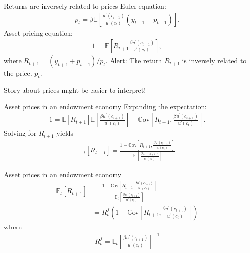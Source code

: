 \documentclass[presentation,dvipsnames]{beamer}
\begin{document}
\begin{frame}[label=sec-4-2]{Returns are inversely related to prices}
Euler equation: %
\begin{align*}
p_{t} = \beta \mathbb{E} \left[ \frac{u^{\prime}(c_{t+1})}{u^{\prime}(c_{t})} (y_{t+1}+p_{t+1}) \right].
\end{align*}
Asset-pricing equation:
\begin{align*}
1 = \mathbb{E} \left[ R_{t+1} \frac{\beta u^{\prime}(c_{t+1})}{c^{\prime}(c_{t})} \right],
\end{align*}
where $R_{t+1} = (y_{t+1} + p_{t+1})/p_{t}$.
\alert{Alert}: The return $R_{t+1}$ is inversely related to the price, $p_{t}$.

\vspace{1em}

\textcolor{RubineRed}{Story about prices might be easier to interpret!}
\end{frame}

\begin{frame}[label=sec-4-3]{Asset prices in an endowment economy}
Expanding the expectation: 
\begin{align*}
1 = \mathbb{E} \left[ R_{t+1} \right] \mathbb{E} \left[ \frac{\beta u^{\prime}(c_{t+1})}{u^{\prime}(c_{t})} \right] + \mathbb{C} \text{ov} \left[ R_{t+1}, \frac{\beta u^{\prime}(c_{t+1})}{u^{\prime}(c_{t})} \right].
\end{align*}
Solving for $R_{t+1}$ yields
\begin{align*}
\mathbb{E}_{t} \left[ R_{t+1} \right] = \frac{1 - \mathbb{C} \text{ov} \left[ R_{t+1}, \frac{\beta u^{\prime}(c_{t+1})}{u^{\prime}(c_{t})} \right]}{ \mathbb{E}_{t} \left[ \frac{\beta u^{\prime}(c_{t+1})}{u^{\prime}(c_{t})} \right]}
\end{align*}
\end{frame}

\begin{frame}[label=sec-4-4]{Asset prices in an endowment economy}
\begin{align*}
\mathbb{E}_{t} \left[ R_{t+1} \right] &= \frac{1 - \mathbb{C} \text{ov} \left[ R_{t+1}, \frac{\beta u^{\prime}(c_{t+1})}{u^{\prime}(c_{t})} \right]}{ \mathbb{E}_{t} \left[ \frac{\beta u^{\prime}(c_{t+1})}{u^{\prime}(c_{t})} \right]} \\
&= R^{f}_{t} \left( 1 - \mathbb{C} \text{ov} \left[ R_{t+1}, \frac{\beta u^{\prime}(c_{t+1})}{u^{\prime}(c_{t})} \right] \right)
\end{align*}
where
\begin{align*}
R^{f}_{t} = \mathbb{E}_{t} \left[ \frac{\beta u^{\prime}(c_{t+1})}{u^{\prime}(c_{t})} \right]^{-1} 
\end{align*}
\end{frame}
\end{document}
